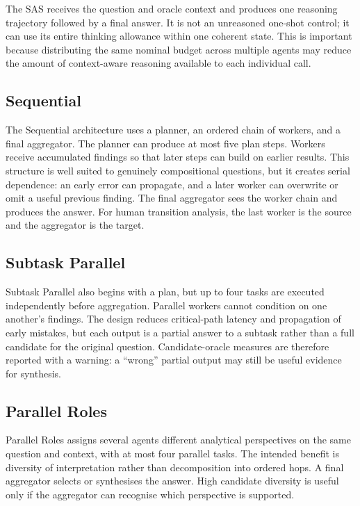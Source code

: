 The SAS receives the question and oracle context and produces one reasoning trajectory followed by a final answer. It is not an unreasoned one-shot control; it can use its entire thinking allowance within one coherent state. This is important because distributing the same nominal budget across multiple agents may reduce the amount of context-aware reasoning available to each individual call.

\subsection{Sequential}

The Sequential architecture uses a planner, an ordered chain of workers, and a final aggregator. The planner can produce at most five plan steps. Workers receive accumulated findings so that later steps can build on earlier results. This structure is well suited to genuinely compositional questions, but it creates serial dependence: an early error can propagate, and a later worker can overwrite or omit a useful previous finding. The final aggregator sees the worker chain and produces the answer. For human transition analysis, the last worker is the source and the aggregator is the target.

\subsection{Subtask Parallel}

Subtask Parallel also begins with a plan, but up to four tasks are executed independently before aggregation. Parallel workers cannot condition on one another's findings. The design reduces critical-path latency and propagation of early mistakes, but each output is a partial answer to a subtask rather than a full candidate for the original question. Candidate-oracle measures are therefore reported with a warning: a ``wrong'' partial output may still be useful evidence for synthesis.

\subsection{Parallel Roles}

Parallel Roles assigns several agents different analytical perspectives on the same question and context, with at most four parallel tasks. The intended benefit is diversity of interpretation rather than decomposition into ordered hops. A final aggregator selects or synthesises the answer. High candidate diversity is useful only if the aggregator can recognise which perspective is supported.

